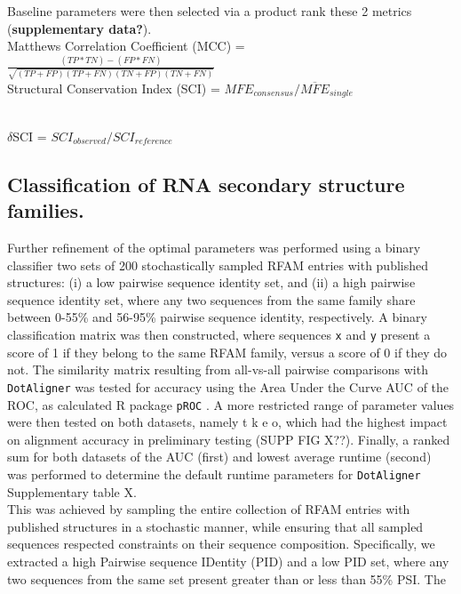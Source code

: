 \documentclass[a4paper,11pt]{article}
\newcommand\dotaligner{\texttt{DotAligner}}
\begin{document}
Baseline parameters were then selected via a product rank these 2 metrics 
(\textbf{supplementary data?}).\\

Matthews Correlation Coefficient (MCC) = $\frac{(TP * TN) - (FP * FN)}{ \sqrt{ (TP + FP)(TP + FN)(TN + FP)(TN + FN) }}$\\

Structural Conservation Index (SCI) = $ MFE_{consensus}  / \overline{MFE}_{single}  $\\\

$\delta$SCI = $SCI_{observed} / SCI_{reference}$

\subsection*{ Classification of RNA secondary structure families. }

Further refinement of the optimal parameters was performed using a binary classifier two sets of 
200 stochastically sampled RFAM entries with published structures: 
(i) a low pairwise sequence identity set, and (ii) a high pairwise sequence identity set, 
where any two sequences from the same family share between 0-55\% and 56-95\% pairwise sequence identity, respectively. A binary classification matrix was then constructed, where sequences \texttt{x} and \texttt{y}
present a score of 1 if they belong to the same RFAM family, versus a score of 0 if they do not. 
The similarity matrix resulting from all-vs-all pairwise comparisons with \dotaligner{} was tested for 
accuracy using the Area Under the Curve AUC of the ROC, as calculated R package \texttt{pROC} \cite{robin2011proc}. 
A more restricted range of parameter values were then tested on both datasets, {\color{red} namely t k e o, which had the highest impact on alignment accuracy in preliminary testing (SUPP FIG X??)}. Finally, a ranked sum for both datasets of the AUC (first) and lowest average runtime (second) was performed to determine the default runtime parameters for \dotaligner{} {\color{red} Supplementary table X}. \\


This was achieved by sampling the entire collection of RFAM entries with published structures 
in a stochastic manner, while ensuring that all sampled sequences respected constraints 
on their sequence composition. Specifically, we extracted a high Pairwise sequence IDentity (PID) 
and a low PID set, where any two sequences from the same set present greater than or less than 
55\% PSI. The 
\end{document}
